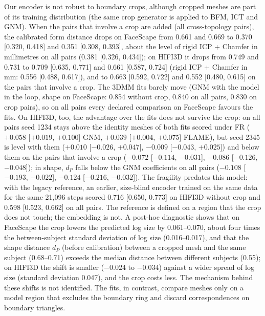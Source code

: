 \documentclass[10pt,twocolumn,letterpaper]{article}
\begin{document}
Our encoder is not robust to boundary crops, although cropped meshes are part of its training distribution (the same crop generator is applied to BFM, ICT and GNM). When the pairs that involve a crop are added (all cross-topology pairs), the calibrated form distance drops on FaceScape from 0.661 and 0.669 to 0.370 [0.320, 0.418] and 0.351 [0.308, 0.393], about the level of rigid ICP + Chamfer in millimetres on all pairs (0.381 [0.326, 0.434]); on HIFI3D it drops from 0.749 and 0.731 to 0.709 [0.635, 0.771] and 0.661 [0.587, 0.724] (rigid ICP + Chamfer in mm: 0.556 [0.488, 0.617]), and to 0.663 [0.592, 0.722] and 0.552 [0.480, 0.615] on the pairs that involve a crop. The 3DMM fits barely move (GNM with the model in the loop, shape on FaceScape: 0.854 without crop, 0.840 on all pairs, 0.830 on crop pairs), so on all pairs every declared comparison on FaceScape favours the fits. On HIFI3D, too, the advantage over the fits does not survive the crop: on all pairs seed 1234 stays above the identity meshes of both fits scored under FR ($+0.058$ [$+0.019$, $+0.100$] GNM, $+0.039$ [$+0.004$, $+0.075$] FLAME), but seed 2345 is level with them ($+0.010$ [$-0.026$, $+0.047$], $-0.009$ [$-0.043$, $+0.025$]) and below them on the pairs that involve a crop ($-0.072$ [$-0.114$, $-0.031$], $-0.086$ [$-0.126$, $-0.048$]); in shape, $d_P$ falls below the GNM coefficients on all pairs ($-0.108$ [$-0.193$, $-0.022$], $-0.124$ [$-0.216$, $-0.032$]). The fragility predates this model: with the legacy reference, an earlier, size-blind encoder trained on the same data for the same 21{,}096 steps scored 0.716 [0.650, 0.773] on HIFI3D without crop and 0.598 [0.523, 0.662] on all pairs. The reference is defined on a region that the crop does not touch; the embedding is not. A post-hoc diagnostic shows that on FaceScape the crop lowers the predicted log size by 0.061--0.070, about four times the between-subject standard deviation of log size (0.016--0.017), and that the shape distance $d_P$ (before calibration) between a cropped mesh and the same subject (0.68--0.71) exceeds the median distance between different subjects (0.55); on HIFI3D the shift is smaller ($-0.024$ to $-0.034$) against a wider spread of log size (standard deviation 0.047), and the crop costs less. The mechanism behind these shifts is not identified. The fits, in contrast, compare meshes only on a model region that excludes the boundary ring and discard correspondences on boundary triangles.
\end{document}
